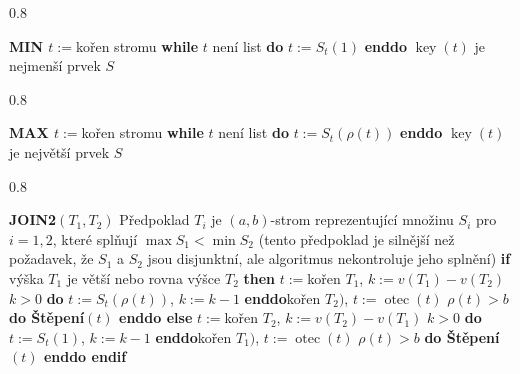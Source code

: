 \documentclass[a4paper,12pt]{article}
\DeclareMathOperator*{\otec}{otec}
\DeclareMathOperator*{\key}{key}
\newcommand{\algoritmus}[1]{
  {
  \setlength\fboxrule{0.5pt}

  \begin{boxedminipage}{0.8\textwidth}

 #1
  \end{boxedminipage}

  }
  }
\begin{document}
\algoritmus{
{\bf MIN\newline 
$t:=$}kořen stromu\newline 
{\bf \textsf{while}} $t$ není list {\bf \textsf{do}} $t:=S_t(1)$ {\bf \textsf{enddo}}\newline 
$\key(t)$ je nejmenší prvek $S$
}
\algoritmus{
{\bf MAX\newline 
$t:=$}kořen stromu\newline 
{\bf \textsf{while}} $t$ není list {\bf \textsf{do}} $t:=S_t(\rho (t))$ {\bf \textsf{enddo}}\newline 
$\key(t)$ je největší prvek $S$
}

\algoritmus{
{\bf JOIN2$(T_1,T_2)$}\newline
Předpoklad $T_i$ je $(a,b)$-strom reprezentující 
množinu $S_i$ pro $i=1,2$, které splňují $\max S_1<\min 
S_2$ 
(tento předpoklad je silnější než požadavek, že $
S_1$ a 
$S_2$ jsou disjunktní, ale algoritmus nekontroluje jeho splnění)\newline 
{\bf \textsf{if}} výška $T_1$ je větší nebo rovna výšce $T_2$ {\bf \textsf{then}}\newline 
\phantom{---}$t:=$kořen $T_1$, $k:=v(T_1)-v(T_2)$\newline 
\phantom{---}{\bf \textsf{while}} $k>0$ {\bf \textsf{do}} $t:=S_t(\rho (t))$, $k:=k-1$ {\bf \textsf{enddo}}\newline \phantom{---}{\bf Spojení$(t,$}kořen $T_2)$, $t:=\otec(t)$\newline 
\phantom{---}{\bf \textsf{while}} $\rho (t)>b$ {\bf \textsf{do} Štěpení$(t)$ \textsf{enddo}\newline 
\textsf{else}}\newline 
\phantom{---}$t:=$kořen $T_2$, $k:=v(T_2)-v(T_1)$ \newline 
\phantom{---}{\bf \textsf{while}} $k>0$ {\bf \textsf{do}} $t:=S_t(1)$, $k:=k-1$ {\bf \textsf{enddo}}\newline \phantom{---}{\bf Spojení$(t,$}kořen $T_1)$, $t:=\otec(t)$\newline 
\phantom{---}{\bf \textsf{while}} $\rho (t)>b$ {\bf \textsf{do} Štěpení$(t)$ \textsf{enddo}\newline 
\textsf{endif}}
}
\end{document}
